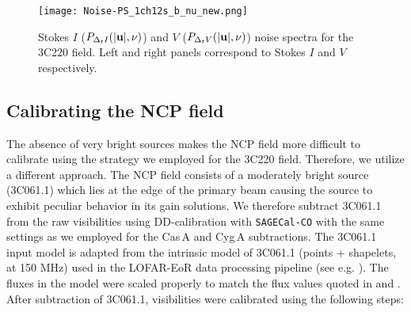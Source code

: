 \documentclass[fleqn,usenatbib]{mnras}
\begin{document}
 \begin{figure*}
\centering
\texttt{[image: Noise-PS\_1ch12s\_b\_nu\_new.png]}
    \caption{Stokes $I$ ($P_{\Delta_t I}(|{\it \mathbf{u}}|,\nu)$) and $V$ ($P_{\Delta_t V}(|{\it \mathbf{u}}|,\nu)$) noise spectra for the 3C220 field. Left and right panels correspond to Stokes $I$ and $V$ respectively.} 
\label{fig:noise_PS_IV}
\end{figure*} 
 
\subsection{Calibrating the NCP field}\label{subsec:NCPcal}

The absence of very bright sources makes the NCP field more difficult to calibrate using the strategy we employed for the 3C220 field. Therefore, we utilize a different approach. The NCP field consists of a moderately bright source (3C061.1) which lies at the edge of the primary beam causing the source to exhibit peculiar behavior in its gain solutions. We therefore subtract 3C061.1 from the raw visibilities using DD-calibration with \texttt{SAGECal-CO} with the same settings as we employed for the Cas\,A and Cyg\,A subtractions. The 3C061.1 input model is adapted from the intrinsic model of 3C061.1 (points + shapelets, at 150 MHz) used in the LOFAR-EoR data processing pipeline (see e.g. \citealt{patil2017}). The fluxes in the model were scaled properly to match the flux values quoted in \cite{laing1980} and \cite{hales1995}. After subtraction of 3C061.1, visibilities were calibrated using the following steps:
\end{document}
